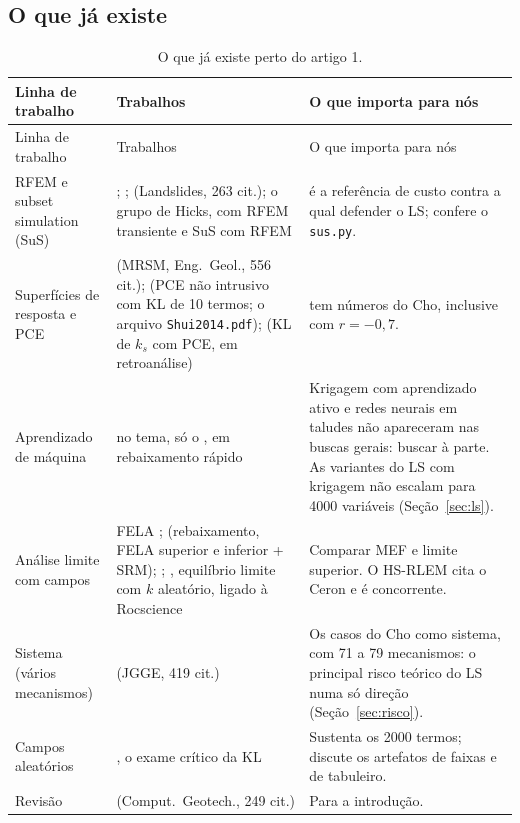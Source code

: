 \documentclass[11pt,a4paper]{article}
\begin{document}
\subsection{O que já existe}
{\small\setlength{\tabcolsep}{4pt}
\begin{longtable}{L{2.9cm}L{6.8cm}L{6.0cm}}
\caption{O que já existe perto do artigo 1.}\label{tab:existe}\\
\toprule
Linha de trabalho & Trabalhos & O que importa para nós \\
\midrule\endfirsthead
\toprule Linha de trabalho & Trabalhos & O que importa para nós \\ \midrule\endhead
\bottomrule\endlastfoot
RFEM e subset simulation (SuS) & \citet{griffiths2004}; \citet{wang2011}; \citet{li2016} (Landslides, 263 cit.); o grupo
  de Hicks, com RFEM transiente \citep{liu2016} e SuS com RFEM \citep{vandeneijnden2017} &
  \citet{li2016} é a referência de custo contra a qual defender o LS; \citet{wang2011} confere o \texttt{sus.py}. \\
Superfícies de resposta e PCE & \citet{li2015} (MRSM, Eng.\ Geol., 556 cit.); \citet{jiang2014} (PCE não intrusivo com
  KL de 10 termos; o arquivo \texttt{Shui2014.pdf}); \citet{yang2018} (KL de $k_s$ com PCE, em retroanálise) &
  \citet{li2015} tem números do Cho, inclusive com $r = -0{,}7$. \\
Aprendizado de máquina & no tema, só o \citet{xgboost2024}, em rebaixamento rápido & Krigagem com aprendizado
  ativo e redes neurais em taludes não apareceram nas buscas gerais: buscar à parte. As variantes do LS com krigagem
  não escalam para 4000 variáveis (Seção~\ref{sec:ls}). \\
Análise limite com campos & FELA \citep{huang2013}; \citet{wang2022} (rebaixamento, FELA superior e inferior + SRM);
  \citet{rafela2022}; \citet{hsrlem2026}, equilíbrio limite com $k$ aleatório, ligado à Rocscience &
  Comparar MEF e limite superior. O HS-RLEM cita o Ceron e é concorrente. \\
Sistema (vários mecanismos) & \citet{jiang2015} (JGGE, 419 cit.) & Os casos do Cho como sistema, com 71 a 79
  mecanismos: o principal risco teórico do LS numa só direção (Seção~\ref{sec:risco}). \\
Campos aleatórios & \citet{dyson2026}, o exame crítico da KL & Sustenta os 2000 termos; discute os artefatos de faixas
  e de tabuleiro. \\
Revisão & \citet{jiang2022} (Comput.\ Geotech., 249 cit.) & Para a introdução. \\
\end{longtable}}
\end{document}
